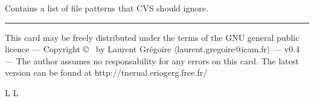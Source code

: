 Contains a list of file patterns that CVS should ignore.\par
{}

\vfill \hrule\smallskip
{\smallrm This card may be freely distributed under
the terms of the GNU general public licence ---
Copyright \copyright\ {} by Laurent Gr\'egoire
$\langle${\smalltt laurent.gregoire@icam.fr}$\rangle$ --- v0.4 ---
The author assumes no responsability for any errors on this card.
The latest version can be found at
{\smalltt http://tnerual.eriogerg.free.fr/}}

\supereject
\if L\lr \else\null\vfill\eject\fi
\if L\lr \else\null\vfill\eject\fi
\bye

